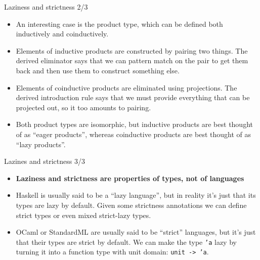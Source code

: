 \documentclass{beamer}
\begin{document}
\begin{frame}{Laziness and strictness 2/3}
\begin{itemize}
	\item An interesting case is the product type, which can be defined both inductively and coinductively.
	\item Elements of inductive products are constructed by pairing two things. The derived eliminator says that we can pattern match on the pair to get them back and then use them to construct something else.
	\item Elements of coinductive products are eliminated using projections. The derived introduction rule says that we must provide everything that can be projected out, so it too amounts to pairing.
	\item Both product types are isomorphic, but inductive products are best thought of as ``eager products'', whereas coinductive products are best thought of as ``lazy products''.
\end{itemize}
\end{frame}

\begin{frame}{Lazines and strictness 3/3}
\begin{itemize}
	\item \textbf{Laziness and strictness are properties of types, not of languages}
	\item Haskell is usually said to be a ``lazy language'', but in reality it's just that its types are lazy by default. Given some strictness annotations we can define strict types or even mixed strict-lazy types.
	\item OCaml or StandardML are usually said to be ``strict'' languages, but it's just that their types are strict by default. We can make the type \texttt{'a} lazy by turning it into a function type with unit domain: \texttt{unit -> 'a}.
\end{itemize}
\end{frame}
\end{document}
